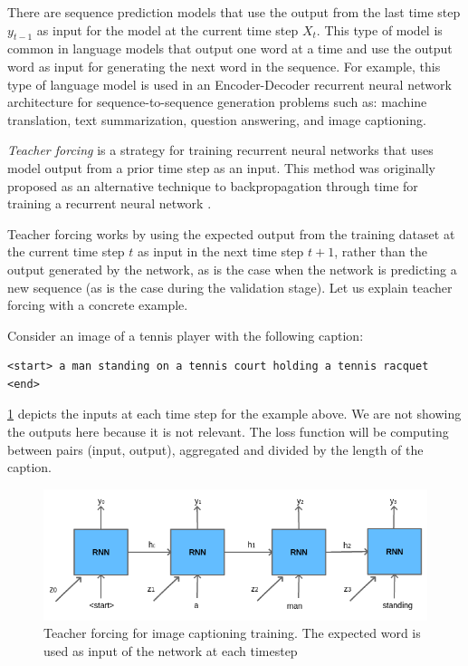 There are sequence prediction models that use the output from the last time step $y_{t-1}$ as input for the model at the current time step $X_t$. This type of model is common in language models that output one word at a time and use the output word as input for generating the next word in the sequence.
For example, this type of language model is used in an Encoder-Decoder recurrent neural network architecture for sequence-to-sequence generation problems such as: machine translation, text summarization, question answering, and image captioning.

\textit{Teacher forcing} is a strategy for training recurrent neural networks that uses model output from a prior time step as an input. This method was originally proposed as an alternative technique to backpropagation through time for training a recurrent neural network \citep{Williams1989}.

Teacher forcing works by using the expected output from the training dataset at the current time step $t$ as input in the next time step $t+1$, rather than the output generated by the network, as is the case when the network is predicting a new sequence (as is the case during the validation stage). Let us explain teacher forcing with a concrete example.

Consider an image of a tennis player with the following caption:

\begin{verbatim}
<start> a man standing on a tennis court holding a tennis racquet <end>    
\end{verbatim}

\cref{fig:teacher-forcing} depicts the inputs at each time step for the example above. We are not showing the outputs here because it is not relevant. The loss function will be computing between pairs (input, output), aggregated and divided by the length of the caption.

\begin{figure}[hpt]
	\centering
	\includegraphics[scale=0.5]{images/ch4/teacher-forcing.png}
	\caption{Teacher forcing for image captioning training. The expected word is used as input of the network at each timestep}
	\label{fig:teacher-forcing}
\end{figure}

